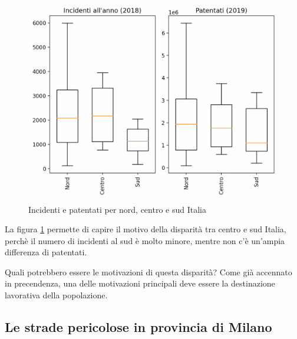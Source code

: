 \documentclass[a4paper]{report}
\begin{document}
\begin{figure}
    \includegraphics[width=\linewidth]{../src/incidenti/incidenti_aci/mappe_regioni/incidenti_patenti_box.png}
    \caption{Incidenti e patentati per nord, centro e sud Italia}
    \label{fig:incidenti-patentati-box}
\end{figure}

La figura \ref{fig:incidenti-patentati-box} permette di capire il motivo della disparità 
tra centro e sud Italia, perchè il numero di incidenti al sud è molto minore, mentre 
non c'è un'ampia differenza di patentati. 

Quali potrebbero essere le motivazioni di questa disparità?
Come già accennato in precendenza, una delle motivazioni principali 
deve essere la destinazione lavorativa della popolazione.


\subsection{Le strade pericolose in provincia di Milano}
\end{document}
